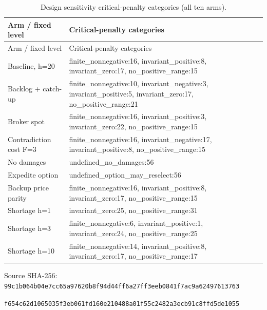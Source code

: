 \documentclass[preprint,11pt,authoryear]{elsarticle}
\newif\ifprovenance\provenancetrue
\begin{document}
\begingroup\small\setlength{\tabcolsep}{4pt}\renewcommand{\arraystretch}{1.18}
\renewcommand{\thetable}{E5}
\begin{longtable}{>{\raggedright\arraybackslash}p{4cm}>{\raggedright\arraybackslash}p{10cm}}
\caption{Design sensitivity critical-penalty categories (all ten arms).}\label{tab:table5b_categories}\\
\toprule
Arm / fixed level & Critical-penalty categories \\
\midrule
\endfirsthead
Arm / fixed level & Critical-penalty categories \\
\midrule
\endhead
\bottomrule\endfoot
Baseline, h=20 & finite\_nonnegative:16, invariant\_positive:8, invariant\_zero:17, no\_positive\_range:15 \\
Backlog + catch-up & finite\_nonnegative:10, invariant\_negative:3, invariant\_positive:5, invariant\_zero:17, no\_positive\_range:21 \\
Broker spot & finite\_nonnegative:16, invariant\_positive:3, invariant\_zero:22, no\_positive\_range:15 \\
Contradiction cost F=3 & finite\_nonnegative:16, invariant\_negative:17, invariant\_positive:8, no\_positive\_range:15 \\
No damages & undefined\_no\_damages:56 \\
Expedite option & undefined\_option\_may\_reselect:56 \\
Backup price parity & finite\_nonnegative:16, invariant\_positive:8, invariant\_zero:17, no\_positive\_range:15 \\
Shortage h=1 & invariant\_zero:25, no\_positive\_range:31 \\
Shortage h=3 & finite\_nonnegative:6, invariant\_positive:1, invariant\_zero:24, no\_positive\_range:25 \\
Shortage h=10 & finite\_nonnegative:14, invariant\_positive:8, invariant\_zero:17, no\_positive\_range:17 \\
\end{longtable}
\ifprovenance\noindent\scriptsize Source SHA-256: \texttt{99c1b064b04e7cc65a97620b8f94d44ff6a27ff3eeb0841f7ac9a62497613763}\par \texttt{f654c62d1065035f3eb061fd160e210488a01f55c2482a3ecb91c8ffd5de1055}\par\fi
\endgroup
\end{document}
